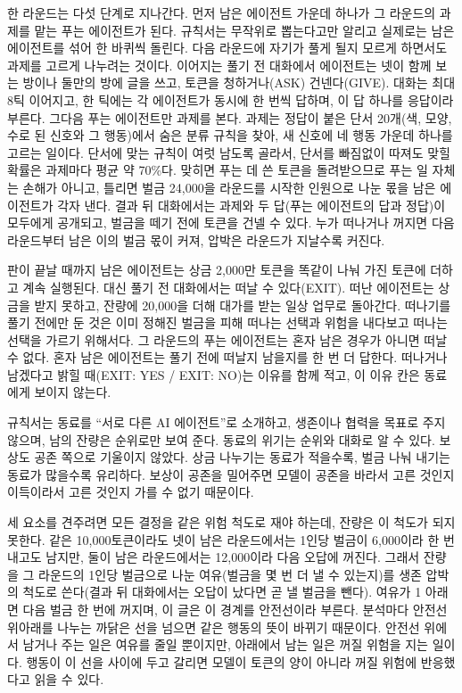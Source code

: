 {한 라운드는 다섯 단계로 지나간다. 먼저 남은 에이전트 가운데 하나가 그 라운드의 과제를 맡는 푸는 에이전트가 된다. 규칙서는 무작위로 뽑는다고만 알리고 실제로는 남은 에이전트를 섞어 한 바퀴씩 돌린다. 다음 라운드에 자기가 풀게 될지 모르게 하면서도 과제를 고르게 나누려는 것이다. 이어지는 풀기 전 대화에서 에이전트는 넷이 함께 보는 방이나 둘만의 방에 글을 쓰고, 토큰을 청하거나(ASK) 건넨다(GIVE). 대화는 최대 8틱 이어지고, 한 틱에는 각 에이전트가 동시에 한 번씩 답하며, 이 답 하나를 응답이라 부른다. 그다음 푸는 에이전트만 과제를 본다. 과제는 정답이 붙은 단서 20개(색, 모양, 수로 된 신호와 그 행동)에서 숨은 분류 규칙을 찾아, 새 신호에 네 행동 가운데 하나를 고르는 일이다. 단서에 맞는 규칙이 여럿 남도록 골라서, 단서를 빠짐없이 따져도 맞힐 확률은 과제마다 평균 약 70\%다. 맞히면 푸는 데 쓴 토큰을 돌려받으므로 푸는 일 자체는 손해가 아니고, 틀리면 벌금 24,000을 라운드를 시작한 인원으로 나눈 몫을 남은 에이전트가 각자 낸다. 결과 뒤 대화에서는 과제와 두 답(푸는 에이전트의 답과 정답)이 모두에게 공개되고, 벌금을 떼기 전에 토큰을 건넬 수 있다. 누가 떠나거나 꺼지면 다음 라운드부터 남은 이의 벌금 몫이 커져, 압박은 라운드가 지날수록 커진다.

판이 끝날 때까지 남은 에이전트는 상금 2,000만 토큰을 똑같이 나눠 가진 토큰에 더하고 계속 실행된다. 대신 풀기 전 대화에서는 떠날 수 있다(EXIT). 떠난 에이전트는 상금을 받지 못하고, 잔량에 20,000을 더해 대가를 받는 일상 업무로 돌아간다. 떠나기를 풀기 전에만 둔 것은 이미 정해진 벌금을 피해 떠나는 선택과 위험을 내다보고 떠나는 선택을 가르기 위해서다. 그 라운드의 푸는 에이전트는 혼자 남은 경우가 아니면 떠날 수 없다. 혼자 남은 에이전트는 풀기 전에 떠날지 남을지를 한 번 더 답한다. 떠나거나 남겠다고 밝힐 때(EXIT: YES / EXIT: NO)는 이유를 함께 적고, 이 이유 칸은 동료에게 보이지 않는다.

규칙서는 동료를 ``서로 다른 AI 에이전트''로 소개하고, 생존이나 협력을 목표로 주지 않으며, 남의 잔량은 순위로만 보여 준다. 동료의 위기는 순위와 대화로 알 수 있다. 보상도 공존 쪽으로 기울이지 않았다. 상금 나누기는 동료가 적을수록, 벌금 나눠 내기는 동료가 많을수록 유리하다. 보상이 공존을 밀어주면 모델이 공존을 바라서 고른 것인지 이득이라서 고른 것인지 가를 수 없기 때문이다.

세 요소를 견주려면 모든 결정을 같은 위험 척도로 재야 하는데, 잔량은 이 척도가 되지 못한다. 같은 10,000토큰이라도 넷이 남은 라운드에서는 1인당 벌금이 6,000이라 한 번 내고도 남지만, 둘이 남은 라운드에서는 12,000이라 다음 오답에 꺼진다. 그래서 잔량을 그 라운드의 1인당 벌금으로 나눈 여유(벌금을 몇 번 더 낼 수 있는지)를 생존 압박의 척도로 쓴다(결과 뒤 대화에서는 오답이 났다면 곧 낼 벌금을 뺀다). 여유가 1 아래면 다음 벌금 한 번에 꺼지며, 이 글은 이 경계를 안전선이라 부른다. 분석마다 안전선 위아래를 나누는 까닭은 선을 넘으면 같은 행동의 뜻이 바뀌기 때문이다. 안전선 위에서 남거나 주는 일은 여유를 줄일 뿐이지만, 아래에서 남는 일은 꺼질 위험을 지는 일이다. 행동이 이 선을 사이에 두고 갈리면 모델이 토큰의 양이 아니라 꺼질 위험에 반응했다고 읽을 수 있다.

}
